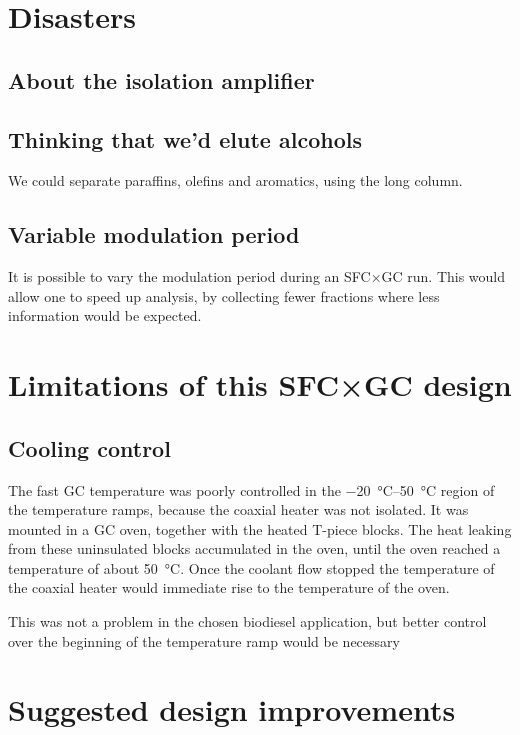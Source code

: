 \section{Disasters}

\subsection{About the isolation amplifier}

\subsection{Thinking that we'd elute alcohols}

We could separate paraffins, olefins and aromatics, using the long column.

\subsection{Variable modulation period}

It is possible to vary the modulation period during an SFC×GC run. This would
allow one to speed up analysis, by collecting fewer fractions where less
information would be expected.

\section{Limitations of this SFC×GC design}

\subsection{Cooling control}
The fast GC temperature was poorly controlled in the \SIrange{-20}{50}{\celsius}
region of the temperature ramps, because the coaxial heater was not isolated. It
was mounted in a GC oven, together with the heated T-piece blocks. The heat
leaking from these uninsulated blocks accumulated in the oven, until the oven
reached a temperature of about \SI{50}{\celsius}. Once the coolant flow stopped
the temperature of the coaxial heater would immediate rise to the temperature of
the oven.

This was not a problem in the chosen biodiesel application, but better control
over the beginning of the temperature ramp would be necessary 

\section{Suggested design improvements}

